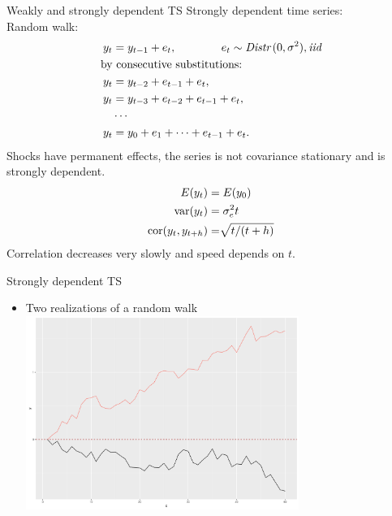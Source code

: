 \documentclass{beamer}
\begin{document}
\begin{frame}{Weakly and strongly dependent TS}
Strongly dependent time series:\\
Random walk:  
\begin{align}\nonumber
y_t &= y_{t-1}+e_t, \qquad \qquad e_t \sim \textit{Distr\,}(0,\sigma^2), \textit{iid} \\ \nonumber
\textnormal{by} & \textnormal{~consecutive substitutions:} \\ \nonumber 
y_t &= y_{t-2}+e_{t-1}+e_t, \\\nonumber
y_t &= y_{t-3}+e_{t-2}+e_{t-1}+e_t, \\\nonumber
& \cdots \\ \nonumber
y_t &= y_0 + e_1 + \dots +e_{t-1} + e_t.
\end{align} 
Shocks have permanent effects, the series is not covariance stationary and is strongly dependent.
\begin{align}\nonumber
E(y_t) & =E(y_0) \\\nonumber
\textnormal{var}(y_t) & =\sigma^2_e t \\\nonumber
\textnormal{cor}(y_t,y_{t+h}) & =\sqrt[]{t/(t+h)}
\end{align} 
Correlation decreases very slowly and speed depends on $t$.
\end{frame}
\begin{frame}{Strongly dependent TS}
\begin{itemize}
\item Two realizations of a random walk \\
\vspace{0.5cm}
\includegraphics[width=0.7\textwidth]{img/random_walk.pdf}
\end{itemize}
\end{frame}
\end{document}
